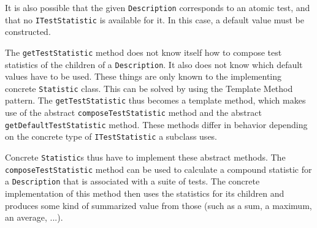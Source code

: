 \documentclass[i2]{oss}
\newcommand{\class}[1]{\texttt{#1}}
\newcommand{\method}[1]{\texttt{#1}}
\begin{document}
It is also possible that the given \class{Description} corresponds to an atomic test, and that no \class{ITestStatistic} is available for it. In this case, a default value must be constructed.

The \method{getTestStatistic} method does not know itself how to compose test statistics of the children of a \class{Description}. It also does not know which default values have to be used. These things are only known to the implementing concrete \class{Statistic} class. This can be solved by using the Template Method pattern. The \method{getTestStatistic} thus becomes a template method, which  makes use of the abstract \method{composeTestStatistic} method and the abstract \method{getDefaultTestStatistic} method. These methods differ in behavior depending on the concrete type of \class{ITestStatistic} a subclass uses.

Concrete \class{Statistic}s thus have to implement these abstract methods. The \method{composeTestStatistic} method can be used to calculate a compound statistic for a 
\class{Description} that is associated with a suite of tests.
The concrete implementation of this method then uses the statistics for
its children and produces some kind of summarized value from those (such as a sum, a maximum, an average, ...).
\end{document}
